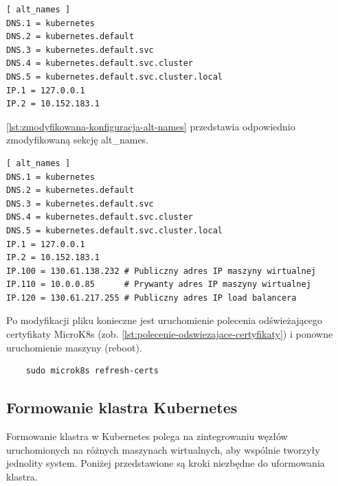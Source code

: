 \begin{listing}[H]
    \begin{verbatim}
[ alt_names ]
DNS.1 = kubernetes
DNS.2 = kubernetes.default
DNS.3 = kubernetes.default.svc
DNS.4 = kubernetes.default.svc.cluster
DNS.5 = kubernetes.default.svc.cluster.local
IP.1 = 127.0.0.1
IP.2 = 10.152.183.1
    \end{verbatim}
    \caption{Domyślna sekcja alt\_names maszyny wirtualnej c1}
    \label{lst:domyslna-konfiguracja-alt-names}
\end{listing}

\noindent\autoref{lst:zmodyfikowana-konfiguracja-alt-names} przedstawia odpowiednio zmodyfikowaną sekcję alt\_names.

\begin{listing}[H]
    \begin{verbatim}
[ alt_names ]
DNS.1 = kubernetes
DNS.2 = kubernetes.default
DNS.3 = kubernetes.default.svc
DNS.4 = kubernetes.default.svc.cluster
DNS.5 = kubernetes.default.svc.cluster.local
IP.1 = 127.0.0.1
IP.2 = 10.152.183.1
IP.100 = 130.61.138.232 # Publiczny adres IP maszyny wirtualnej
IP.110 = 10.0.0.85      # Prywanty adres IP maszyny wirtualnej
IP.120 = 130.61.217.255 # Publiczny adres IP load balancera
    \end{verbatim}
    \caption{Zmodyfikowana sekcja alt\_names na maszynie wirtualnej c1}
    \label{lst:zmodyfikowana-konfiguracja-alt-names}
\end{listing}

\noindent Po modyfikacji pliku konieczne jest uruchomienie polecenia odświeżającego certyfikaty MicroK8s (zob. \autoref{lst:polecenie-odswiezajace-certyfikaty}) i ponowne uruchomienie maszyny (reboot).

\begin{listing}[H]
    \begin{verbatim}
    sudo microk8s refresh-certs
    \end{verbatim}
    \caption{Polecenie odświeżające certyfikaty MicroK8s}
    \label{lst:polecenie-odswiezajace-certyfikaty}
\end{listing}

\subsection{Formowanie klastra Kubernetes}

\noindent Formowanie klastra w Kubernetes polega na zintegrowaniu węzłów uruchomionych na różnych maszynach wirtualnych, aby wspólnie tworzyły jednolity system.
Poniżej przedstawione są kroki niezbędne do uformowania klastra.

